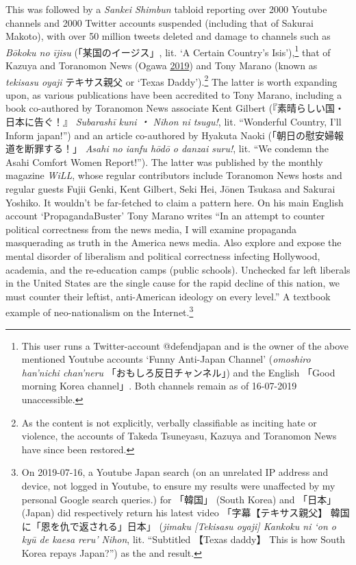 \documentclass[10pt,british,A4paper,,openany]{memoir}
\begin{document}
This was followed by a \emph{Sankei Shimbun} tabloid reporting over 2000
Youtube channels and 2000 Twitter accounts suspended (including that of
Sakurai Makoto), with over 50 million tweets deleted and damage to
channels such as \emph{Bōkoku no ījisu} (「某国のイージス」, lit. `A
Certain Country's Isis'),\footnote{This user runs a Twitter-account
  @defendjapan and is the owner of the above mentioned Youtube accounts
  `Funny Anti-Japan Channel' (\emph{omoshiro han'nichi chan'neru}
  「おもしろ反日チャンネル」) and the English 「Good morning Korea
  channel」. Both channels remain as of 16-07-2019 unaccessible.} that
of Kazuya and Toranomon News (Ogawa
\protect\hyperlink{ref-ogawa_eng._2019}{2019}) and Tony Marano (known as
\emph{tekisasu oyaji} テキサス親父 or `Texas Daddy').\footnote{As the
  content is not explicitly, verbally classifiable as inciting hate or
  violence, the accounts of Takeda Tsuneyasu, Kazuya and Toranomon News
  have since been restored.} The latter is worth expanding upon, as
various publications have been accredited to Tony Marano, including a
book co-authored by Toranomon News associate Kent Gilbert
(『素晴らしい国・日本に告ぐ！』 \emph{Subarashī kuni ・ Nihon ni
tsugu!}, lit. ``Wonderful Country, I'll Inform japan!'') and an article
co-authored by Hyakuta Naoki (「朝日の慰安婦報道を断罪する！」
\emph{Asahi no ianfu hōdō o danzai suru!}, lit. ``We condemn the Asahi
Comfort Women Report!''). The latter was published by the monthly
magazine \emph{WiLL}, whose regular contributors include Toranomon News
hosts and regular guests Fujii Genki, Kent Gilbert, Seki Hei, Jōnen
Tsukasa and Sakurai Yoshiko. It wouldn't be far-fetched to claim a
pattern here. On his main English account `PropagandaBuster' Tony Marano
writes ``In an attempt to counter political correctness from the news
media, I will examine propaganda masquerading as truth in the America
news media. Also explore and expose the mental disorder of liberalism
and political correctness infecting Hollywood, academia, and the
re-education camps (public schools). Unchecked far left liberals in the
United States are the single cause for the rapid decline of this nation,
we must counter their leftist, anti-American ideology on every level.''
A textbook example of neo-nationalism on the Internet.\footnote{On
  2019-07-16, a Youtube Japan search (on an unrelated IP address and
  device, not logged in Youtube, to ensure my results were unaffected by
  my personal Google search queries.) for 「韓国」 (South Korea) and
  「日本」 (Japan) did respectively return his latest video
  「字幕【テキサス親父】 韓国に「恩を仇で返される」日本」 (\emph{jimaku
  {[}Tekisasu oyaji{]} Kankoku ni `on o kyū de kaesa reru' Nihon}, lit.
  ``Subtitled 【Texas daddy】 This is how South Korea repays Japan?'')
  as the  and  result.}
\end{document}
